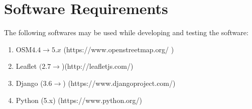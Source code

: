 \section{Software Requirements}
The following softwares may be used while developing and testing the software:
\begin{enumerate} 
	
	\item OSM$  4.4 \rightarrow 5.x $ (https://www.openstreetmap.org/ )
	
	\item Leaflet $ (2.7 \rightarrow $)(http://leafletjs.com/)
	
	\item Django ($ 3.6 \rightarrow $) (https://www.djangoproject.com/)
	
	\item Python (5.x) (https://www.python.org/)
	
\end{enumerate}

